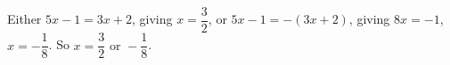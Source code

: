 Either $5x-1=3x+2$, giving $x=\dfrac{3}{2}$, or $5x-1=-(3x+2)$, giving $8x=-1$, $x=-\dfrac{1}{8}$. So $x=\boxed{\dfrac{3}{2}\text{ or }-\dfrac{1}{8}}$.
